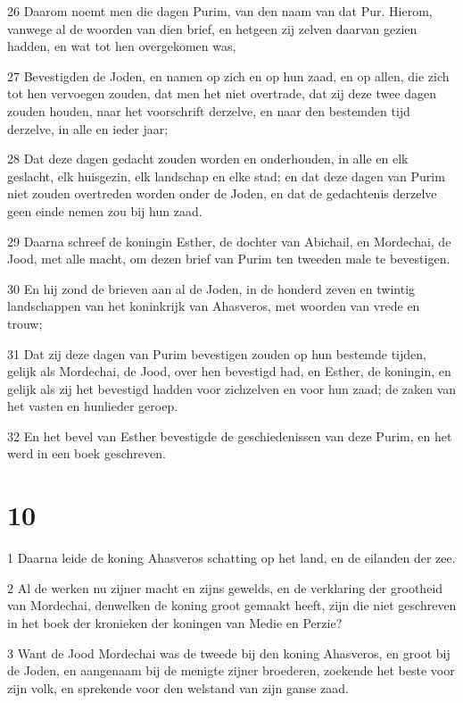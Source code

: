 \par 26 Daarom noemt men die dagen Purim, van den naam van dat Pur. Hierom, vanwege al de woorden van dien brief, en hetgeen zij zelven daarvan gezien hadden, en wat tot hen overgekomen was,
\par 27 Bevestigden de Joden, en namen op zich en op hun zaad, en op allen, die zich tot hen vervoegen zouden, dat men het niet overtrade, dat zij deze twee dagen zouden houden, naar het voorschrift derzelve, en naar den bestemden tijd derzelve, in alle en ieder jaar;
\par 28 Dat deze dagen gedacht zouden worden en onderhouden, in alle en elk geslacht, elk huisgezin, elk landschap en elke stad; en dat deze dagen van Purim niet zouden overtreden worden onder de Joden, en dat de gedachtenis derzelve geen einde nemen zou bij hun zaad.
\par 29 Daarna schreef de koningin Esther, de dochter van Abichail, en Mordechai, de Jood, met alle macht, om dezen brief van Purim ten tweeden male te bevestigen.
\par 30 En hij zond de brieven aan al de Joden, in de honderd zeven en twintig landschappen van het koninkrijk van Ahasveros, met woorden van vrede en trouw;
\par 31 Dat zij deze dagen van Purim bevestigen zouden op hun bestemde tijden, gelijk als Mordechai, de Jood, over hen bevestigd had, en Esther, de koningin, en gelijk als zij het bevestigd hadden voor zichzelven en voor hun zaad; de zaken van het vasten en hunlieder geroep.
\par 32 En het bevel van Esther bevestigde de geschiedenissen van deze Purim, en het werd in een boek geschreven.

\chapter{10}

\par 1 Daarna leide de koning Ahasveros schatting op het land, en de eilanden der zee.
\par 2 Al de werken nu zijner macht en zijns gewelds, en de verklaring der grootheid van Mordechai, denwelken de koning groot gemaakt heeft, zijn die niet geschreven in het boek der kronieken der koningen van Medie en Perzie?
\par 3 Want de Jood Mordechai was de tweede bij den koning Ahasveros, en groot bij de Joden, en aangenaam bij de menigte zijner broederen, zoekende het beste voor zijn volk, en sprekende voor den welstand van zijn ganse zaad.



